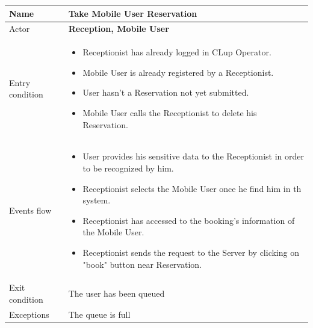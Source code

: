 \begin{tabular}{|p{5cm} | p{7cm} | }
	\hline
	Name & \textbf{Take Mobile User Reservation} \\
	\hline
	Actor & \textbf{Reception, Mobile User} \\
	\hline
	Entry condition &
	\begin{itemize}
		\item Receptionist has already logged in CLup Operator. 
 		\item Mobile User is already registered by a Receptionist.
		\item User hasn't a Reservation not yet submitted. 
        \item Mobile User calls the Receptionist to delete his Reservation.
	\end{itemize} \\
	\hline
	Events flow & 
	\begin{itemize}
        \item User provides his sensitive data to the Receptionist in order to be recognized by him. 
        \item Receptionist selects the Mobile User once he find him in th system.
		\item Receptionist has accessed to the booking's information of the Mobile User.
        \item Receptionist sends the request to the Server by clicking on "book" button near Reservation.
	\end{itemize} \\
	\hline
	Exit condition &
	The user has been queued \\
	\hline 
	Exceptions & 
	The queue is full \\
	\hline
\end{tabular}

